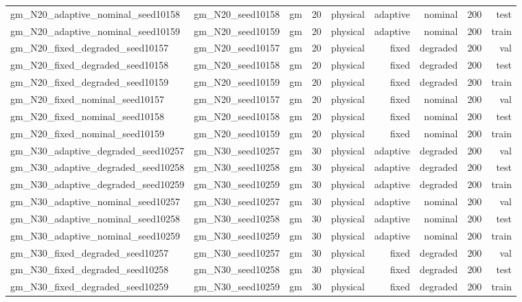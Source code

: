 \begin{tabular}{lrrrrrrrr}
gm\_N20\_adaptive\_nominal\_seed10158 & gm\_N20\_seed10158 & gm & 20 & physical & adaptive & nominal & 200 & test \\
gm\_N20\_adaptive\_nominal\_seed10159 & gm\_N20\_seed10159 & gm & 20 & physical & adaptive & nominal & 200 & train \\
gm\_N20\_fixed\_degraded\_seed10157 & gm\_N20\_seed10157 & gm & 20 & physical & fixed & degraded & 200 & val \\
gm\_N20\_fixed\_degraded\_seed10158 & gm\_N20\_seed10158 & gm & 20 & physical & fixed & degraded & 200 & test \\
gm\_N20\_fixed\_degraded\_seed10159 & gm\_N20\_seed10159 & gm & 20 & physical & fixed & degraded & 200 & train \\
gm\_N20\_fixed\_nominal\_seed10157 & gm\_N20\_seed10157 & gm & 20 & physical & fixed & nominal & 200 & val \\
gm\_N20\_fixed\_nominal\_seed10158 & gm\_N20\_seed10158 & gm & 20 & physical & fixed & nominal & 200 & test \\
gm\_N20\_fixed\_nominal\_seed10159 & gm\_N20\_seed10159 & gm & 20 & physical & fixed & nominal & 200 & train \\
gm\_N30\_adaptive\_degraded\_seed10257 & gm\_N30\_seed10257 & gm & 30 & physical & adaptive & degraded & 200 & val \\
gm\_N30\_adaptive\_degraded\_seed10258 & gm\_N30\_seed10258 & gm & 30 & physical & adaptive & degraded & 200 & test \\
gm\_N30\_adaptive\_degraded\_seed10259 & gm\_N30\_seed10259 & gm & 30 & physical & adaptive & degraded & 200 & train \\
gm\_N30\_adaptive\_nominal\_seed10257 & gm\_N30\_seed10257 & gm & 30 & physical & adaptive & nominal & 200 & val \\
gm\_N30\_adaptive\_nominal\_seed10258 & gm\_N30\_seed10258 & gm & 30 & physical & adaptive & nominal & 200 & test \\
gm\_N30\_adaptive\_nominal\_seed10259 & gm\_N30\_seed10259 & gm & 30 & physical & adaptive & nominal & 200 & train \\
gm\_N30\_fixed\_degraded\_seed10257 & gm\_N30\_seed10257 & gm & 30 & physical & fixed & degraded & 200 & val \\
gm\_N30\_fixed\_degraded\_seed10258 & gm\_N30\_seed10258 & gm & 30 & physical & fixed & degraded & 200 & test \\
gm\_N30\_fixed\_degraded\_seed10259 & gm\_N30\_seed10259 & gm & 30 & physical & fixed & degraded & 200 & train \\

\end{tabular}
